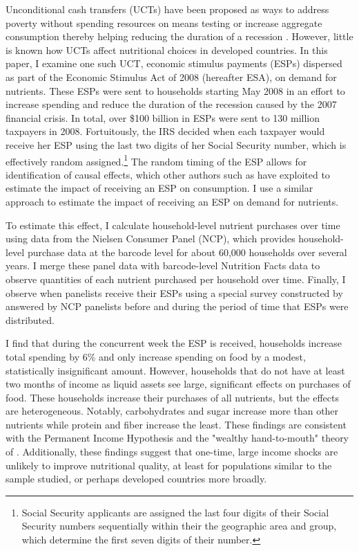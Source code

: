 \documentclass[12pt]{article}
\begin{document}
Unconditional cash transfers (UCTs) have been proposed as ways to address poverty without spending resources on means testing \parencite{hanna2018universal} or increase aggregate consumption thereby helping reducing the duration of a recession \parencite{broda2014economic}.
However, little is known how UCTs affect nutritional choices in developed countries.
In this paper, I examine one such UCT, economic stimulus payments (ESPs) dispersed as part of the Economic Stimulus Act of 2008 (hereafter ESA), on demand for nutrients.
These ESPs were sent to households starting May 2008 in an effort to increase spending and reduce the duration of the recession caused by the 2007 financial crisis.
In total, over \$100 billion in ESPs were sent to 130 million taxpayers in 2008.
Fortuitously, the IRS decided when each taxpayer would receive her ESP using the last two digits of her Social Security number, which is effectively random assigned.\footnote{Social Security applicants are assigned the last four digits of their Social Security numbers sequentially within their the geographic area and group, which determine the first seven digits of their number.} The random timing of the ESP allows for identification of causal effects, which other authors such as \textcite{broda2014economic} have exploited to estimate the impact of receiving an ESP on consumption.
I use a similar approach to estimate the impact of receiving an ESP on demand for nutrients.

To estimate this effect, I calculate household-level nutrient purchases over time using data from the Nielsen Consumer Panel (NCP), which provides household-level purchase data at the barcode level for about 60,000 households over several years.
I merge these panel data with barcode-level Nutrition Facts data to observe quantities of each nutrient purchased per household over time.
Finally, I observe when panelists receive their ESPs using a special survey constructed by \textcite{broda2014economic} answered by NCP panelists before and during the period of time that ESPs were distributed.

I find that during the concurrent week the ESP is received, households increase total spending by 6\% and only increase spending on food by a modest, statistically insignificant amount.
However, households that do not have at least two months of income as liquid assets see large, significant effects on purchases of food.
These households increase their purchases of all nutrients, but the effects are heterogeneous.
Notably, carbohydrates and sugar increase more than other nutrients while protein and fiber increase the least.
These findings are consistent with the Permanent Income Hypothesis and the "wealthy hand-to-mouth" theory of \textcite{kaplan2014model}.
Additionally, these findings suggest that one-time, large income shocks are unlikely to improve nutritional quality, at least for populations similar to the sample studied, or perhaps developed countries more broadly.
\end{document}
